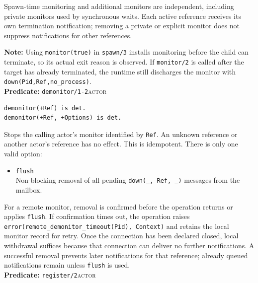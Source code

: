 Spawn-time monitoring and additional monitors are independent, including
private monitors used by synchronous waits. Each active reference receives its
own termination notification; removing a private or explicit monitor does not
suppress notifications for other references.

\medskip
\noindent \textbf{Note:} Using \texttt{monitor(\allowbreak{}true)} in \texttt{spawn/\allowbreak{}3}
installs monitoring before the child can terminate, so its actual exit reason
is observed. If \texttt{monitor/\allowbreak{}2} is called after the target has already
terminated, the runtime still discharges the monitor with
\texttt{down(\allowbreak{}Pid,\allowbreak{}Ref,\allowbreak{}no\_\allowbreak{}process)}.\\


\noindent \textbf{Predicate:} \texttt{demonitor/\allowbreak{}1-2}\hfill\textsc{actor}

\begin{verbatim}
demonitor(+Ref) is det.
demonitor(+Ref, +Options) is det.
\end{verbatim}

\noindent Stops the calling actor's monitor identified by \texttt{Ref}.
An unknown reference or another actor's reference has no effect. This is idempotent.
There is only one valid option:

\begin{itemize}
\item
  \texttt{flush}\\
  Non-blocking removal of all pending \texttt{down(\allowbreak{}\_\allowbreak{},\allowbreak{}\,\allowbreak{}Ref,\allowbreak{}\,\allowbreak{}\_\allowbreak{})} messages
  from the mailbox.
\end{itemize}

\noindent For a remote monitor, removal is confirmed before the operation
returns or applies \texttt{flush}. If confirmation times out, the operation
raises \texttt{error(\allowbreak{}remote\_\allowbreak{}demonitor\_\allowbreak{}timeout(\allowbreak{}Pid),\allowbreak{} Context)} and retains the
local monitor record for retry. Once the connection has been declared closed,
local withdrawal suffices because that connection can deliver no further
notifications. A successful removal prevents later notifications for that
reference; already queued notifications remain unless \texttt{flush} is used.\\

\noindent \textbf{Predicate:} \texttt{register/\allowbreak{}2}\hfill\textsc{actor}

